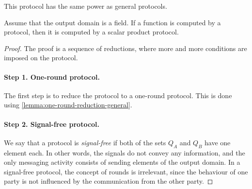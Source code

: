 This protocol has the same power as general protocols. 

\begin{lemma}\label{lem:scalar-product-reduction}
    Assume that the output domain is a field. 
    If a function is computed by a protocol, then it is computed by a scalar product protocol.
\end{lemma}
\begin{proof}
    The proof is a sequence of reductions, where more and more conditions are imposed on the protocol.  
    
    \paragraph*{Step 1. One-round protocol.} The first step is to reduce the protocol to a one-round protocol. This is done using \cref{lemma:one-round-reduction-general}.



 \paragraph*{Step 2. Signal-free protocol.}  We say that a protocol is \emph{signal-free} if both of the sets $Q_A$ and $Q_B$ have one element each. In other words, the signals do not convey any information, and the only messaging activity consists of sending elements of the output domain. In a signal-free protocol, the concept of rounds is irrelevant, since the behaviour of one party is not influenced by the communication from the other party.


\end{proof}
